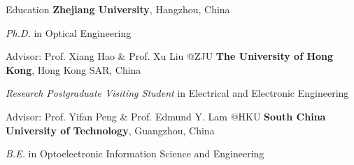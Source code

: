 \begin{rubric}{Education}
	\entry*[2018/09 -- 2023/12]%
	\textbf{Zhejiang University}, Hangzhou, China
	\par \textit{Ph.D.} in Optical Engineering
	\par Advisor: Prof. Xiang Hao \& Prof. Xu Liu @ZJU
\entry*[2022/12 -- 2023/04]%
	\textbf{The University of Hong Kong}, Hong Kong SAR, China
	\par \textit{Research Postgraduate Visiting Student} in Electrical and Electronic Engineering
	\par Advisor: Prof. Yifan Peng \& Prof. Edmund Y. Lam @HKU
\entry*[2014/09 -- 2018/06]%
	\textbf{South China University of Technology}, Guangzhou, China
	\par \textit{B.E.} in Optoelectronic Information Science and Engineering
\end{rubric}